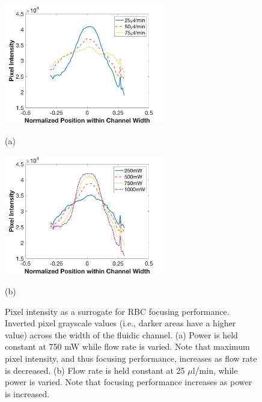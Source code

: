 \begin{figure}[htb]
  \begin{minipage}[t]{0.49\linewidth}\centering
    \includegraphics[width=7cm]{Baseline3PromFlow}
    \medskip
    \centerline{(a)}
  \end{minipage}\hfill
  \begin{minipage}[t]{0.49\linewidth}\centering
    \includegraphics[width=7cm]{Baseline3PromPower}
    \medskip
    \centerline{(b)}
  \end{minipage}
  \caption[Pixel grayscale values across the width of the fluidic channel]{Pixel intensity as a surrogate for RBC focusing performance. Inverted pixel grayscale values (i.e., darker areas have a higher value) across the width of the fluidic channel. (a) Power is held constant at 750 mW while flow rate is varied. Note that maximum pixel intensity, and thus focusing performance, increases as flow rate is decreased. (b) Flow rate is held constant at 25 $\mu$l/min, while power is varied. Note that focusing performance increases as power is increased.}
	\label{fig:pixelPerformance}
\end{figure}

